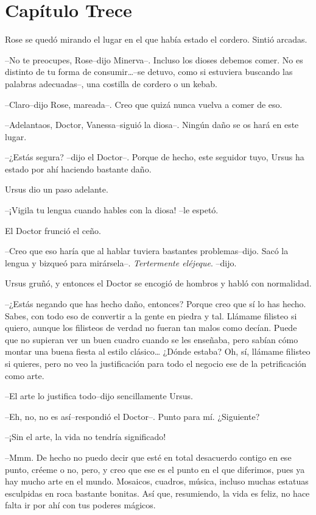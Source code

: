 \chapter*{Capítulo Trece}

Rose se quedó mirando el lugar en el que había estado el cordero. Sintió
arcadas.

--No te preocupes, Rose--dijo Minerva--. Incluso los dioses debemos
comer. No es distinto de tu forma de consumir\ldots{}--se detuvo, como
si estuviera buscando las palabras adecuadas--, una costilla de cordero
o un kebab.

--Claro--dijo Rose, mareada--. Creo que quizá nunca vuelva a comer de
eso.

--Adelantaos, Doctor, Vanessa--siguió la diosa--. Ningún daño se os hará
en este lugar.

--¿Estás segura? --dijo el Doctor--. Porque de hecho, este seguidor
tuyo, Ursus ha estado por ahí haciendo bastante daño.

Ursus dio un paso adelante.

--¡Vigila tu lengua cuando hables con la diosa! --le espetó.

El Doctor frunció el ceño.

--Creo que eso haría que al hablar tuviera bastantes problemas--dijo.
Sacó la lengua y bizqueó para mirársela--. \emph{Tertermente eléjeque}.
--dijo.

Ursus gruñó, y entonces el Doctor se encogió de hombros y habló con
normalidad.

--¿Estás negando que has hecho daño, entonces? Porque creo que sí lo has
hecho. Sabes, con todo eso de convertir a la gente en piedra y tal.
Llámame filisteo si quiero, aunque los filisteos de verdad no fueran tan
malos como decían. Puede que no supieran ver un buen cuadro cuando se
les enseñaba, pero sabían cómo montar una buena fiesta al estilo
clásico\ldots{} ¿Dónde estaba? Oh, sí, llámame filisteo si quieres, pero
no veo la justificación para todo el negocio ese de la petrificación
como arte.

--El arte lo justifica todo--dijo sencillamente Ursus.

--Eh, no, no es así--respondió el Doctor--. Punto para mí. ¿Siguiente?

--¡Sin el arte, la vida no tendría significado!

--Mmm. De hecho no puedo decir que esté en total desacuerdo contigo en
ese punto, créeme o no, pero, y creo que ese es el punto en el que
diferimos, pues ya hay mucho arte en el mundo. Mosaicos, cuadros,
música, incluso muchas estatuas esculpidas en roca bastante bonitas. Así
que, resumiendo, la vida es feliz, no hace falta ir por ahí con tus
poderes mágicos.

